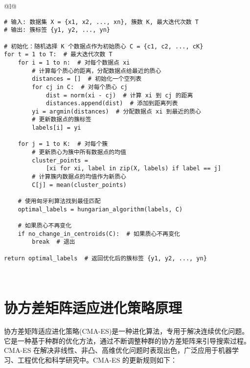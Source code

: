 \documentclass[master]{thesis-uestc}
\begin{document}
\begin{table}[h]
    \caption{KMeans算法伪代码}
    \begin{tabular}{@{}l@{}} %
    \toprule
     \\ %
    \midrule
    \begin{lstlisting}[basicstyle=\ttfamily,frame=none]
# 输入: 数据集 X = {x1, x2, ..., xn}, 簇数 K, 最大迭代次数 T
# 输出: 簇标签 {y1, y2, ..., yn}

# 初始化：随机选择 K 个数据点作为初始质心 C = {c1, c2, ..., cK}
for t = 1 to T:  # 最大迭代次数 T
    for i = 1 to n:  # 对每个数据点 xi
        # 计算每个质心的距离，分配数据点给最近的质心
        distances = []  # 初始化一个空列表
        for cj in C:  # 对每个质心 cj
            dist = norm(xi - cj)  # 计算 xi 到 cj 的距离
            distances.append(dist)  # 添加到距离列表
        yi = argmin(distances)  # 分配数据点 xi 到最近的质心
        # 更新数据点的簇标签
        labels[i] = yi
    
    for j = 1 to K:  # 对每个簇
        # 更新质心为簇中所有数据点的均值
        cluster_points = 
            [xi for xi, label in zip(X, labels) if label == j]
        # 计算簇内数据点的均值作为新质心
        C[j] = mean(cluster_points)
    
    # 使用匈牙利算法找到最佳匹配
    optimal_labels = hungarian_algorithm(labels, C)
    
    # 如果质心不再变化
    if no_change_in_centroids(C):  # 如果质心不再变化
        break  # 退出

return optimal_labels  # 返回优化后的簇标签 {y1, y2, ..., yn}
    \end{lstlisting} \\
    \bottomrule
    \end{tabular}
    \label{table:kmeans_code}
\end{table}
\FloatBarrier  %
\section{协方差矩阵适应进化策略原理}
协方差矩阵适应进化策略(CMA-ES)是一种进化算法，专用于解决连续优化问题。它是一种基于种群的优化方法，通过不断调整种群的协方差矩阵来引导搜索过程。CMA-ES 在解决非线性、非凸、高维优化问题时表现出色，广泛应用于机器学习、工程优化和科学研究中。CMA-ES 的更新规则如下：
\end{document}
